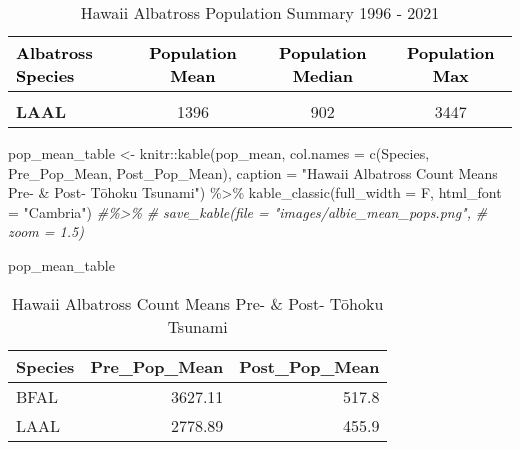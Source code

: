 \documentclass[
]{article}
\newenvironment{Shaded}{\begin{snugshade}}{\end{snugshade}}
\newcommand{\AttributeTok}[1]{\textcolor[rgb]{0.77,0.63,0.00}{#1}}
\newcommand{\CommentTok}[1]{\textcolor[rgb]{0.56,0.35,0.01}{\textit{#1}}}
\newcommand{\FunctionTok}[1]{\textcolor[rgb]{0.00,0.00,0.00}{#1}}
\newcommand{\NormalTok}[1]{#1}
\newcommand{\OtherTok}[1]{\textcolor[rgb]{0.56,0.35,0.01}{#1}}
\newcommand{\SpecialCharTok}[1]{\textcolor[rgb]{0.00,0.00,0.00}{#1}}
\newcommand{\StringTok}[1]{\textcolor[rgb]{0.31,0.60,0.02}{#1}}
\begin{document}
\begin{table}

\caption{\label{tab:unnamed-chunk-11}Hawaii Albatross Population Summary 1996 - 2021}
\centering
\fontsize{15}{17}\selectfont
\begin{tabular}[t]{>{}l|c|c|c}
\hline
\textcolor{black}{\textbf{Albatross Species}} & \textcolor{black}{\textbf{Population Mean}} & \textcolor{black}{\textbf{Population Median}} & \textcolor{black}{\textbf{Population Max}}\\
\hline
\textbf{\cellcolor{gray!6}{BFAL}} & \cellcolor{gray!6}{2003} & \cellcolor{gray!6}{2008} & \cellcolor{gray!6}{4740}\\
\hline
\textbf{LAAL} & 1396 & 902 & 3447\\
\hline
\end{tabular}
\end{table}

\begin{Shaded}
\begin{Highlighting}[]
\NormalTok{pop\_mean\_table }\OtherTok{\textless{}{-}}\NormalTok{ knitr}\SpecialCharTok{::}\FunctionTok{kable}\NormalTok{(pop\_mean,}
                               \AttributeTok{col.names =} \FunctionTok{c}\NormalTok{(}\StringTok{\textquotesingle{}Species\textquotesingle{}}\NormalTok{, }\StringTok{\textquotesingle{}Pre\_Pop\_Mean\textquotesingle{}}\NormalTok{, }\StringTok{\textquotesingle{}Post\_Pop\_Mean\textquotesingle{}}\NormalTok{),}
                               \AttributeTok{caption =} \StringTok{"Hawaii Albatross Count Means Pre{-} \& Post{-} Tōhoku Tsunami"}\NormalTok{) }\SpecialCharTok{\%\textgreater{}\%} 
  \FunctionTok{kable\_classic}\NormalTok{(}\AttributeTok{full\_width =}\NormalTok{ F, }\AttributeTok{html\_font =} \StringTok{"Cambria"}\NormalTok{) }\CommentTok{\#\%\textgreater{}\% }
  \CommentTok{\# save\_kable(file = "images/albie\_mean\_pops.png",}
  \CommentTok{\#            zoom = 1.5)}

\NormalTok{pop\_mean\_table}
\end{Highlighting}
\end{Shaded}

\begin{table}

\caption{\label{tab:unnamed-chunk-15}Hawaii Albatross Count Means Pre- & Post- Tōhoku Tsunami}
\centering
\begin{tabular}[t]{l|r|r}
\hline
Species & Pre\_Pop\_Mean & Post\_Pop\_Mean\\
\hline
BFAL & 3627.11 & 517.8\\
\hline
LAAL & 2778.89 & 455.9\\
\hline
\end{tabular}
\end{table}
\end{document}
